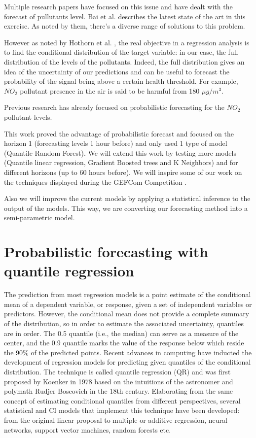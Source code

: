 \documentclass[a4paper,twocolumn,5p]{elsarticle}
\begin{document}
Multiple research papers have focused on this issue and have dealt
with the forecast of pullutants level. Bai et al. \cite{bai_air_2018}
describes the latest state of the art in this exercise. As noted by
them, there's a diverse range of solutions to this problem.

However as noted by Hothorn et al. \cite{hothorn_conditional_2014},
the real objective in a regression analysis is to find the conditional
distribution of the target variable: in our case, the full
distribution of the levels of the pollutants. Indeed, the full
distribution gives an idea of the uncertainty of our predictions and
can be useful to forecast the probability of the signal being above a
certain health threshold.  For example, $NO_2$ pollutant presence in
the air is said to be harmful from 180 $\mu g / m^3$.

Previous research \cite{proba_aznarte} has already focused on
probabilistic forecasting for the $NO_2$ pollutant levels.

This work proved the advantage of probabilistic forecast and focused
on the horizon 1 (forecasting levels 1 hour before) and only used 1
type of model (Quantile Random Forest). We will extend this work by
testing more models (Quantile linear regression, Gradient Boosted
trees and K Neighbors) and for different horizons (up to 60 hours
before).  We will inspire some of our work on the techniques displayed
during the GEFCom Competition \cite{mangalova_k-nearest_2016}
\cite{hong_probabilistic_2016}.

Also we will improve the current models by applying a statistical
inference to the output of the models. This way, we are converting our
forecasting method into a semi-parametric model.

\section{Probabilistic forecasting with quantile regression}
\label{sec:probForec}

The prediction from most regression models is a
point estimate of the conditional mean of a dependent variable, or
response, given a set of independent variables or predictors. However,
the conditional mean does not provide a complete summary
of the distribution, so in order to estimate the associated
uncertainty, quantiles are in order. The 0.5 quantile (i.e., the
median) can serve as a measure of the center, and the 0.9 quantile
marks the value of the response below which reside the 90\% of the
predicted points. Recent advances in computing have inducted the
development of regression models for predicting given quantiles of the
conditional distribution. The technique is called quantile regression
(QR) and was first proposed by Koenker in 1978
\cite{koenker_quantile_2001} based on the intuitions of the
astronomer and polymath Rudjer Boscovich in the 18th
century. Elaborating from the same concept of estimating conditional
quantiles from different perspectives, several statistical and CI
models that implement this technique have been developed: from the
original linear proposal to multiple or additive regression, neural
networks, support vector machines, random forests etc.
\end{document}
